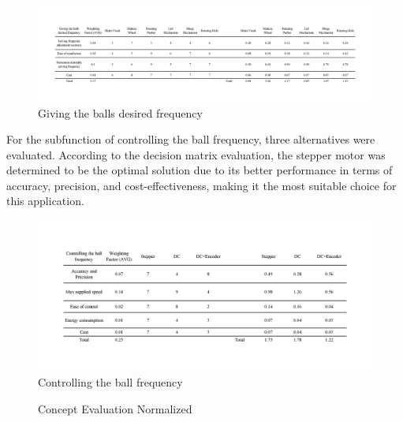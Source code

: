 \documentclass[12pt]{article}
\begin{document}
\begin{figure}[H]
    \centering
    \includegraphics[width=1\textwidth]{Decision matrices/give frequency.png}
    \caption{ Giving the balls desired frequency}
\end{figure}

For the subfunction of controlling the ball frequency, three alternatives were evaluated. According to the decision matrix evaluation, the stepper motor was determined to be the optimal solution due to its better performance in terms of accuracy, precision, and cost-effectiveness, making it the most suitable choice for this application.

\begin{figure}[H]
    \centering
    \includegraphics[width=1\textwidth]{Decision matrices/control frequency.png}
    \caption{Controlling the ball frequency}
\end{figure}


\begin{figure}[H]
    \centering
    \caption{Concept Evaluation Normalized\cite{statista2024}}
    \label{fig:wholesales}
\end{figure}
\end{document}
